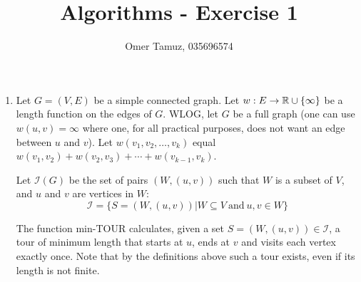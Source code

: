 \documentclass[11pt]{article} \usepackage{amssymb}
\begin{document}
\title{Algorithms - Exercise 1}

 \author{Omer Tamuz, 035696574}
\maketitle


\begin{enumerate}
  \item 
    Let $G=(V,E)$ be a simple connected graph. Let $w:E\to \mathbb R\cup\{\infty\}$ be a length
    function on the edges of $G$. WLOG, let $G$ be a full graph (one can use
    $w(u,v)=\infty$ where one, for all practical purposes, does not want an 
    edge between $u$ and $v$).
    Let $w(v_1,v_2,\ldots,v_k)$ equal 
    $w(v_1,v_2)+w(v_2,v_3)+\cdots+w(v_{k-1},v_k)$.
    
    Let $\mathcal{I}(G)$ be the set of pairs $(W,(u,v))$ such that $W$ is a 
    subset of $V$, and $u$ and $v$ are vertices in $W$:
    \begin{equation*}
      \mathcal{I}=\{S = (W,(u,v))|W\subseteq V\: \textrm{and}\: u,v\in W\}
    \end{equation*}

    The function min-TOUR calculates, given a set 
    $S=(W,(u,v))\in \mathcal{I}$, a tour of minimum length that starts at $u$, ends at $v$
    and visits each vertex exactly once. Note that by the definitions above
    such a tour exists, even if its length is not finite.

    \begin{algorithmic}
      \ELSE
          \ENDIF
         
        \ENDFOR
      \ENDIF
    \end{algorithmic}
    

\end{enumerate}
\end{document}
